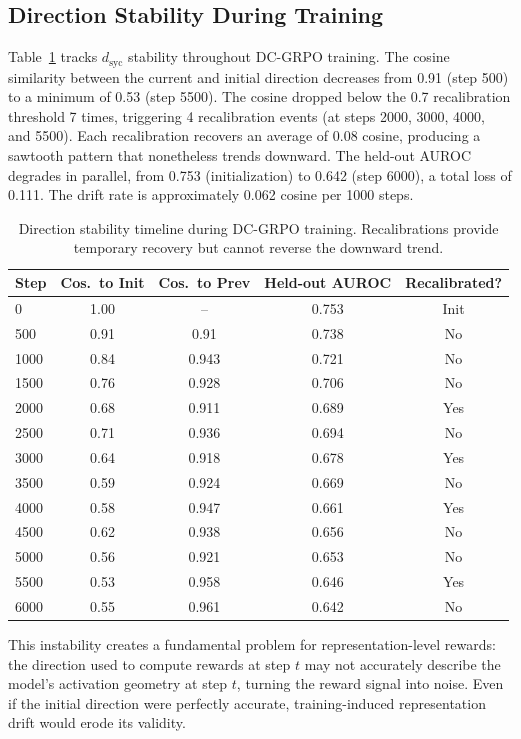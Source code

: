 \documentclass[11pt,a4paper]{article}
\begin{document}
\subsection{Direction Stability During Training}
\label{sec:stability}

Table~\ref{tab:stability} tracks $d_{\mathrm{syc}}$ stability throughout DC-GRPO training. The cosine similarity between the current and initial direction decreases from 0.91 (step 500) to a minimum of 0.53 (step 5500). The cosine dropped below the 0.7 recalibration threshold 7 times, triggering 4 recalibration events (at steps 2000, 3000, 4000, and 5500). Each recalibration recovers an average of 0.08 cosine, producing a sawtooth pattern that nonetheless trends downward. The held-out AUROC degrades in parallel, from 0.753 (initialization) to 0.642 (step 6000), a total loss of 0.111. The drift rate is approximately 0.062 cosine per 1000 steps.

\begin{table}[h]
\centering
\caption{Direction stability timeline during DC-GRPO training. Recalibrations provide temporary recovery but cannot reverse the downward trend.}
\label{tab:stability}
\small
\begin{tabular}{lcccc}
\toprule
Step & Cos.\ to Init & Cos.\ to Prev & Held-out AUROC & Recalibrated? \\
\midrule
0    & 1.00 & --    & 0.753 & Init \\
500  & 0.91 & 0.91  & 0.738 & No \\
1000 & 0.84 & 0.943 & 0.721 & No \\
1500 & 0.76 & 0.928 & 0.706 & No \\
2000 & 0.68 & 0.911 & 0.689 & Yes \\
2500 & 0.71 & 0.936 & 0.694 & No \\
3000 & 0.64 & 0.918 & 0.678 & Yes \\
3500 & 0.59 & 0.924 & 0.669 & No \\
4000 & 0.58 & 0.947 & 0.661 & Yes \\
4500 & 0.62 & 0.938 & 0.656 & No \\
5000 & 0.56 & 0.921 & 0.653 & No \\
5500 & 0.53 & 0.958 & 0.646 & Yes \\
6000 & 0.55 & 0.961 & 0.642 & No \\
\bottomrule
\end{tabular}
\end{table}

This instability creates a fundamental problem for representation-level rewards: the direction used to compute rewards at step $t$ may not accurately describe the model's activation geometry at step $t$, turning the reward signal into noise. Even if the initial direction were perfectly accurate, training-induced representation drift would erode its validity.
\end{document}
